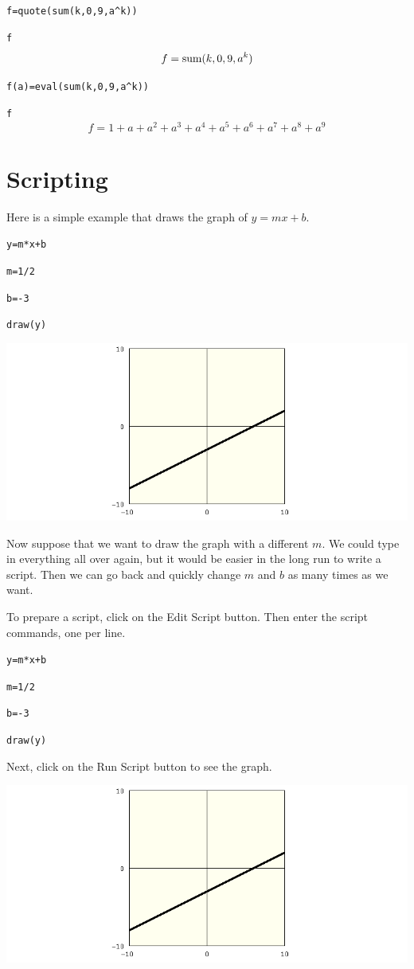 \documentclass[12pt]{book}
\begin{document}
\medskip
\verb$f=quote(sum(k,0,9,a^k))$

\verb$f$
$$f=\mathop{\rm sum}(k,0,9,a^k)$$

\verb$f(a)=eval(sum(k,0,9,a^k))$

\verb$f$
$$f=1+a+a^2+a^3+a^4+a^5+a^6+a^7+a^8+a^9$$

\newpage

\chapter{Scripting}

\noindent
Here is a simple example that draws the graph of $y=mx+b$.

\medskip
{\tt y=m*x+b}

{\tt m=1/2}

{\tt b=-3}

{\tt draw(y)}

\medskip
\noindent
\includegraphics[scale=0.5]{1.png}

\newpage

\noindent
Now suppose that we want to draw the graph
with a different $m$.
We could type in everything all over again, but it would be easier
in the long run to write a script.
Then we can go back and quickly change $m$ and $b$ as many times as we want.

\medskip
\noindent
To prepare a script, click on the Edit Script button.
Then enter the script commands, one per line.

\medskip
{\tt y=m*x+b}

{\tt m=1/2}

{\tt b=-3}

{\tt draw(y)}

\medskip
\noindent
Next, click on the Run Script button to see the graph.

\medskip
\noindent
\includegraphics[scale=0.5]{1.png}
\end{document}
